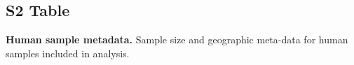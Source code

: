 \documentclass[10pt,letterpaper]{article}
\begin{document}
\subsection*{S2 Table}
\label{stab:globe_data_table}
{\bf{
Human sample metadata.}}
Sample size and geographic meta-data for human samples included in analysis.

%


\end{document}

